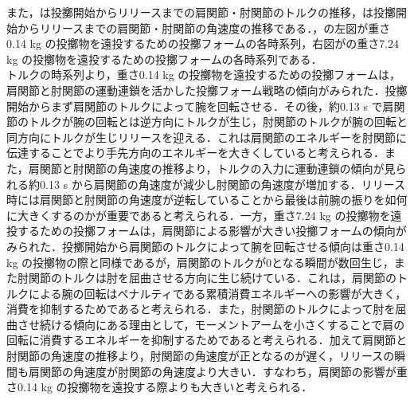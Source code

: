 また，は投擲開始からリリースまでの肩関節・肘関節のトルクの推移，は投擲開始からリリースまでの肩関節・肘関節の角速度の推移である．，の左図が重さ0.14 kg の投擲物を遠投するための投擲フォームの各時系列，右図がの重さ7.24 kg の投擲物を遠投するための投擲フォームの各時系列である．\\
トルクの時系列より，重さ0.14 kg の投擲物を遠投するための投擲フォームは，肩関節と肘関節の運動連鎖を活かした投擲フォーム戦略の傾向がみられた．投擲開始からまず肩関節のトルクによって腕を回転させる．その後，約0.13 s で肩関節のトルクが腕の回転とは逆方向にトルクが生じ，肘関節のトルクが腕の回転と同方向にトルクが生じリリースを迎える．これは肩関節のエネルギーを肘関節に伝達することでより手先方向のエネルギーを大きくしていると考えられる．また，肩関節と肘関節の角速度の推移より，トルクの入力に運動連鎖の傾向が見られる約0.13 s から肩関節の角速度が減少し肘関節の角速度が増加する．リリース時には肩関節と肘関節の角速度が逆転していることから最後は前腕の振りを如何に大きくするのかが重要であると考えられる．一方，重さ7.24 kg の投擲物を遠投するための投擲フォームは，肩関節による影響が大きい投擲フォームの傾向がみられた．投擲開始から肩関節のトルクによって腕を回転させる傾向は重さ0.14 kg の投擲物の際と同様であるが，肩関節のトルクが0となる瞬間が数回生じ，また肘関節のトルクは肘を屈曲させる方向に生じ続けている．これは，肩関節のトルクによる腕の回転はペナルティである累積消費エネルギーへの影響が大きく，消費を抑制するためであると考えられる．また，肘関節のトルクによって肘を屈曲させ続ける傾向にある理由として，モーメントアームを小さくすることで肩の回転に消費するエネルギーを抑制するためであると考えられる．加えて肩関節と肘関節の角速度の推移より，肘関節の角速度が正となるのが遅く，リリースの瞬間も肩関節の角速度が肘関節の角速度より大きい．すなわち，肩関節の影響が重さ0.14 kg の投擲物を遠投する際よりも大きいと考えられる．\\

\clearpage
{}

